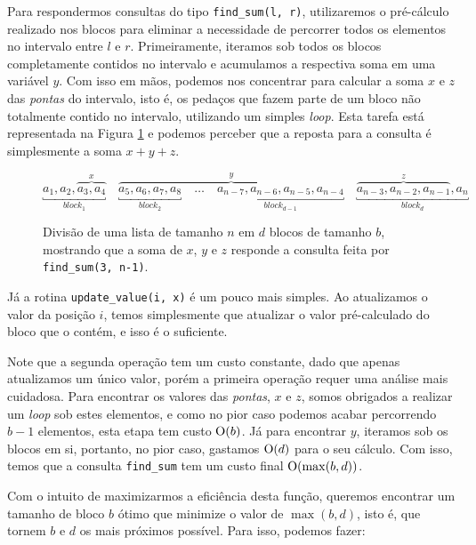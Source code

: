 Para respondermos consultas do tipo \texttt{find\_sum(l, r)}, utilizaremos o pré-cálculo realizado nos blocos para eliminar a necessidade de percorrer todos os elementos no intervalo entre $l$ e $r$. Primeiramente, iteramos sob todos os blocos completamente contidos no intervalo e acumulamos a respectiva soma em uma variável $y$. Com isso em mãos, podemos nos concentrar para calcular a soma $x$ e $z$ das \emph{pontas} do intervalo, isto é, os pedaços que fazem parte de um bloco não totalmente contido no intervalo, utilizando um simples \emph{loop}. Esta tarefa está representada na Figura \ref{fig:sqrt-decomp-blocks} e podemos perceber que a reposta para a consulta é simplesmente a soma $x + y + z$.

\begin{figure}
    \centering
    \begin{equation*}
        \underbracket{a_1, a_2, \overbrace{a_3, a_4}^x}_{block_1} \quad
        \overbrace{
            \underbracket{a_5, a_6, a_7, a_8}_{block_2} \quad
            \dots \quad
            \underbracket{a_{n-7}, a_{n-6}, a_{n-5}, a_{n-4}}_{block_{d-1}}
        }^y \quad
        \underbracket{\overbrace{a_{n-3}, a_{n-2}, a_{n-1}}^z, a_n}_{block_d}
    \end{equation*}
    \caption{Divisão de uma lista de tamanho $n$ em $d$ blocos de tamanho $b$, mostrando que a soma de $x$, $y$ e $z$ responde a consulta feita por \texttt{find\_sum(3, n-1)}.}
    \label{fig:sqrt-decomp-blocks}
\end{figure}

Já a rotina \texttt{update\_value(i, x)} é um pouco mais simples. Ao atualizamos o valor da posição $i$, temos simplesmente que atualizar o valor pré-calculado do bloco que o contém, e isso é o suficiente.

Note que a segunda operação tem um custo constante, dado que apenas atualizamos um único valor, porém a primeira operação requer uma análise mais cuidadosa. Para encontrar os valores das \emph{pontas}, $x$ e $z$, somos obrigados a realizar um \emph{loop} sob estes elementos, e como no pior caso podemos acabar percorrendo $b-1$ elementos, esta etapa tem custo $\mathrm{O}(b)$. Já para encontrar $y$, iteramos sob os blocos em si, portanto, no pior caso, gastamos $\mathrm{O}(d)$ para o seu cálculo. Com isso, temos que a consulta \texttt{find\_sum} tem um custo final $\mathrm{O}(\max(b, d))$.

Com o intuito de maximizarmos a eficiência desta função, queremos encontrar um tamanho de bloco $b$ ótimo que minimize o valor de $\max(b, d)$, isto é, que tornem $b$ e $d$ os mais próximos possível. Para isso, podemos fazer:

